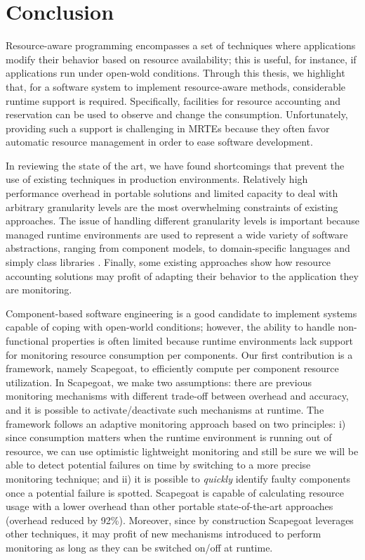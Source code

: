 \section{Conclusion} \label{sec:thesis-conclusions}

Resource-aware programming encompasses a set of techniques where applications modify their behavior based on resource availability;
this is useful, for instance, if applications run under open-wold conditions.
Through this thesis, we highlight that, for a software system to implement resource-aware methods, considerable runtime support is required.
Specifically, facilities for resource accounting and reservation can be used to observe and change the consumption.
Unfortunately, providing such a support is challenging in MRTEs because they often favor automatic resource management in order to ease software development.

In reviewing the state of the art, we have found shortcomings that prevent the use of existing techniques in production environments.
Relatively high performance overhead in portable solutions and limited capacity to deal with arbitrary granularity levels are the most overwhelming constraints of existing approaches.
The issue of handling different granularity levels is important because managed runtime environments are used to represent a wide variety of software abstractions, ranging from component models, to domain-specific languages and simply class libraries .
Finally, some existing approaches show how resource accounting solutions may profit of adapting their behavior to the application they are monitoring.

Component-based software engineering is a good candidate to implement systems capable of coping with open-world conditions; however, the ability to handle non-functional properties is often limited because runtime environments lack support for monitoring resource consumption per components.
Our first contribution is a framework, namely Scapegoat, to efficiently compute per component resource utilization.
In Scapegoat, we make two assumptions: there are previous monitoring mechanisms with different trade-off between overhead and accuracy, and
it is possible to activate/deactivate such mechanisms at runtime.
The framework follows an adaptive monitoring approach based on two principles: i) since consumption matters when the runtime environment is running out
of resource, we can use optimistic lightweight monitoring and still be sure we will be able to detect potential failures on time by switching to a more precise monitoring technique; and ii) it is possible to \textit{quickly} identify faulty components once a potential failure is spotted.
Scapegoat is capable of calculating resource usage with a lower overhead than other portable state-of-the-art approaches (overhead reduced by 92\%).
Moreover, since by construction Scapegoat leverages other techniques, it may profit of new mechanisms introduced to perform monitoring as long as they can be switched on/off at runtime.   

